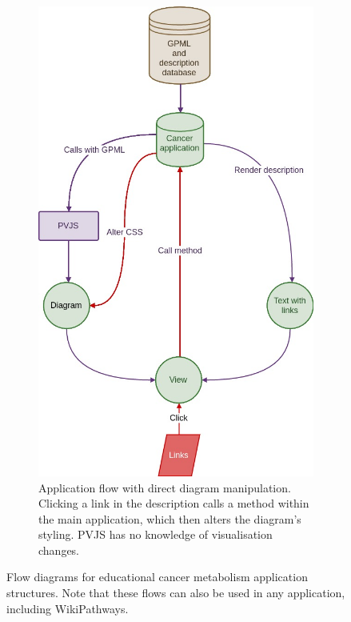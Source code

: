 \documentclass[a4paper,12pt,twoside]{apa}
\begin{document}
\begin{figure}[h]
\begin{subfigure}[b]{0.48\textwidth}
    \label{fig:manipulation-api-flow}
  \end{subfigure}
  \hspace*{\fill} %
  \begin{subfigure}[b]{0.48\textwidth}
    \includegraphics[width=\textwidth]{figures/direct.jpg}
    \caption{Application flow with direct diagram manipulation. Clicking a link in the description calls a method within the main application, which then alters the diagram's styling. PVJS has no knowledge of visualisation changes.}
    \label{fig:direct-diagram-flow}
  \end{subfigure}
  \caption{Flow diagrams for educational cancer metabolism application structures. Note that these flows can also be used in any application,  including WikiPathways.}
  \label{fig:cancer-app-both-flows}
\end{figure}
\end{document}
